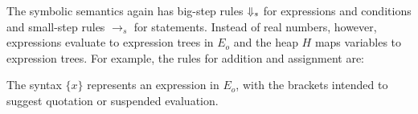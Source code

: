 The symbolic semantics again has big-step rules $\Downarrow_s$ for
expressions and conditions and small-step rules $\to_s$ for
statements. Instead of real numbers, however, expressions evaluate to
expression trees in $E_o$ and the heap $H$ maps variables to
expression trees.  For example, the rules for addition and assignment
are:
%
%
The syntax $\{ x \}$ represents an expression in $E_o$, with the brackets
intended to
suggest quotation or suspended evaluation.

